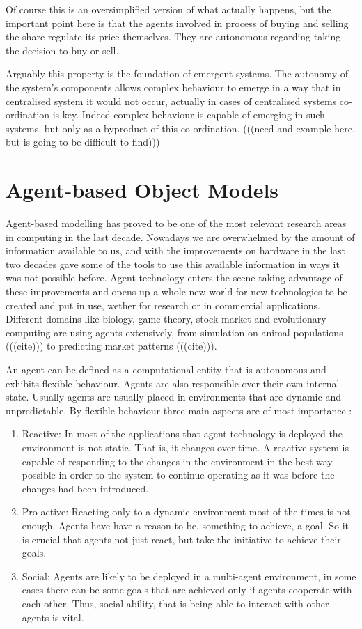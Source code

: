 Of course this is an oversimplified version of what actually happens, but the important point here is that the agents involved in process of buying and selling the share regulate its price themselves. They are autonomous regarding taking the decision to buy or sell.

Arguably this property is the foundation of emergent systems. The autonomy of the system's components allows complex behaviour to emerge in a way that in centralised system it would not occur, actually in cases of centralised systems co-ordination is key. Indeed complex behaviour is capable of emerging in such systems, but only as a byproduct of this co-ordination. (((need and example here, but is going to be difficult to find)))

\section{Agent-based Object Models}

Agent-based modelling has proved to be one of the most relevant research areas in computing in the last decade. Nowadays we are overwhelmed by the amount of information available to us, and with the improvements on hardware in the last two decades gave some of the tools to use this available information in ways it was not possible before. Agent technology enters the scene taking advantage of these improvements and opens up a whole new world for new technologies to be created and put in use, wether for research or in  commercial applications. Different domains like biology, game theory, stock market and evolutionary computing are using agents extensively, from simulation on animal populations (((cite))) to predicting market patterns (((cite))).

An agent can be defined as a computational entity that is autonomous and exhibits flexible behaviour. Agents are also responsible over their own internal state. Usually agents are usually placed in environments that are dynamic and unpredictable. By flexible behaviour three main aspects are of most importance\cite{wooldridge2009introduction} :

\begin{enumerate}
\item Reactive: In most of the applications that agent technology is deployed the environment is not static. That is, it changes over time. A reactive system is capable of responding to the changes in the environment in the best way possible in order to the system to continue operating as it was before the changes had been introduced. 

\item Pro-active: Reacting only to a dynamic environment most of the times is not enough. Agents have have a reason to be, something to achieve, a goal. So it is crucial that agents not just react, but take the initiative to achieve their goals.

\item Social: Agents are likely to be deployed in a multi-agent environment, in some cases there can be some goals that are achieved only if agents cooperate with each other. Thus, social ability, that is being able to interact with other agents is vital.
\end{enumerate}

